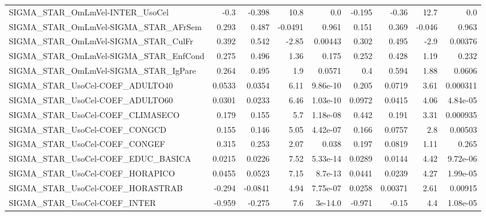 \begin{tabular}{lrrrrrrrr}
SIGMA\_STAR\_OmLmVel-INTER\_UsoCel       &        -0.3 &       -0.398 &    10.8 &      0.0 &     -0.195 &       -0.36 &         12.7 &           0.0 \\
SIGMA\_STAR\_OmLmVel-SIGMA\_STAR\_AFrSem  &       0.293 &        0.487 & -0.0491 &    0.961 &      0.151 &       0.369 &       -0.046 &         0.963 \\
SIGMA\_STAR\_OmLmVel-SIGMA\_STAR\_CulFr   &       0.392 &        0.542 &   -2.85 &  0.00443 &      0.302 &       0.495 &         -2.9 &       0.00376 \\
SIGMA\_STAR\_OmLmVel-SIGMA\_STAR\_EnfCond &       0.275 &        0.496 &    1.36 &    0.175 &      0.252 &       0.428 &         1.19 &         0.232 \\
SIGMA\_STAR\_OmLmVel-SIGMA\_STAR\_IgPare  &       0.264 &        0.495 &     1.9 &   0.0571 &        0.4 &       0.594 &         1.88 &        0.0606 \\
SIGMA\_STAR\_UsoCel-COEF\_ADULTO40       &      0.0533 &       0.0354 &    6.11 & 9.86e-10 &      0.205 &      0.0719 &         3.61 &      0.000311 \\
SIGMA\_STAR\_UsoCel-COEF\_ADULTO60       &      0.0301 &       0.0233 &    6.46 & 1.03e-10 &     0.0972 &      0.0415 &         4.06 &      4.84e-05 \\
SIGMA\_STAR\_UsoCel-COEF\_CLIMASECO      &       0.179 &        0.155 &     5.7 & 1.18e-08 &      0.442 &       0.191 &         3.31 &      0.000935 \\
SIGMA\_STAR\_UsoCel-COEF\_CONGCD         &       0.155 &        0.146 &    5.05 & 4.42e-07 &      0.166 &      0.0757 &          2.8 &       0.00503 \\
SIGMA\_STAR\_UsoCel-COEF\_CONGEF         &       0.315 &        0.253 &    2.07 &    0.038 &      0.197 &      0.0819 &         1.11 &         0.265 \\
SIGMA\_STAR\_UsoCel-COEF\_EDUC\_BASICA    &      0.0215 &       0.0226 &    7.52 & 5.33e-14 &     0.0289 &      0.0144 &         4.42 &      9.72e-06 \\
SIGMA\_STAR\_UsoCel-COEF\_HORAPICO       &      0.0455 &       0.0523 &    7.15 &  8.7e-13 &     0.0441 &      0.0239 &         4.27 &      1.99e-05 \\
SIGMA\_STAR\_UsoCel-COEF\_HORASTRAB      &      -0.294 &      -0.0841 &    4.94 & 7.75e-07 &     0.0258 &     0.00371 &         2.61 &       0.00915 \\
SIGMA\_STAR\_UsoCel-COEF\_INTER          &      -0.959 &       -0.275 &     7.6 &  3e-14.0 &     -0.971 &       -0.15 &          4.4 &      1.08e-05 \\

\end{tabular}
